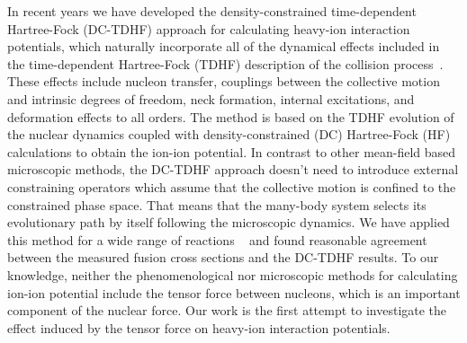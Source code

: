 In recent years we have developed the density-constrained time-dependent Hartree-Fock (DC-TDHF) approach for calculating heavy-ion interaction
potentials, which naturally incorporate all of the dynamical effects included in the time-dependent Hartree-Fock (TDHF) description of the collision process~\citep{Umar2006_PRC74-021601}.
These effects include nucleon transfer, couplings between the collective motion and intrinsic degrees of freedom, neck formation, internal excitations, and deformation effects to all orders.
The method is based on the TDHF evolution of the nuclear dynamics coupled with density-constrained (DC) Hartree-Fock (HF) calculations to obtain the ion-ion potential.
In contrast to other mean-field based microscopic methods, the DC-TDHF approach doesn't need
to introduce external constraining operators which assume that the collective motion is confined to the constrained phase space. That means that the many-body system
selects its evolutionary path by itself following the microscopic dynamics. We have applied this method for a wide range of reactions ~\citep{Umar2006_PRC74-024606,Umar2006_PRC74-061601,Umar2008_PRC77-064605,Umar2008_EPJA37-245, Umar2009_PRC80-041601,Oberacker2010_PRC82-034603,Keser2012_PRC85-044606,Umar2012_PRC85-055801,
	Umar2014_PRC89-034611,Godbey2017_PRC95-011601} and found reasonable agreement between the measured fusion cross sections and the DC-TDHF results.
To our knowledge, neither the phenomenological nor microscopic methods for calculating ion-ion potential include the tensor
force between nucleons, which is an important component of the nuclear force. Our work is the first attempt to investigate the effect induced by the tensor
force on heavy-ion interaction potentials.

